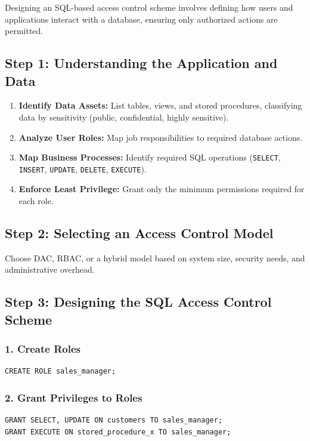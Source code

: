 \documentclass[12pt,a4paper]{article}
\begin{document}
Designing an SQL-based access control scheme involves defining how users and applications interact with a database, ensuring only authorized actions are permitted.

\subsection{Step 1: Understanding the Application and Data}
\begin{enumerate}
    \item \textbf{Identify Data Assets:} List tables, views, and stored procedures, classifying data by sensitivity (public, confidential, highly sensitive).
    \item \textbf{Analyze User Roles:} Map job responsibilities to required database actions.
    \item \textbf{Map Business Processes:} Identify required SQL operations (\texttt{SELECT}, \texttt{INSERT}, \texttt{UPDATE}, \texttt{DELETE}, \texttt{EXECUTE}).
    \item \textbf{Enforce Least Privilege:} Grant only the minimum permissions required for each role.
\end{enumerate}

\subsection{Step 2: Selecting an Access Control Model}
Choose DAC, RBAC, or a hybrid model based on system size, security needs, and administrative overhead.

\subsection{Step 3: Designing the SQL Access Control Scheme}

\subsubsection*{1. Create Roles}
\begin{verbatim}
CREATE ROLE sales_manager;
\end{verbatim}

\subsubsection*{2. Grant Privileges to Roles}
\begin{verbatim}
GRANT SELECT, UPDATE ON customers TO sales_manager;
GRANT EXECUTE ON stored_procedure_x TO sales_manager;
\end{verbatim}
\end{document}

